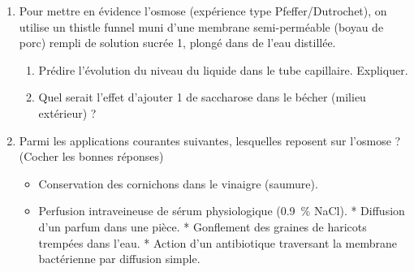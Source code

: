 \documentclass[11pt]{article}
\begin{document}
\begin{exercice}
\begin{enumerate}
    \item Pour mettre en évidence l'osmose (expérience type Pfeffer/Dutrochet), on utilise un thistle funnel muni d'une membrane semi-perméable (boyau de porc) rempli de solution sucrée \SI{1}{\molar}, plongé dans de l'eau distillée.
    \begin{enumerate}
        \item Prédire l'évolution du niveau du liquide dans le tube capillaire. Expliquer.
        \item Quel serait l'effet d'ajouter \SI{1}{\molar} de saccharose dans le bécher (milieu extérieur) ?
    \end{enumerate}
    \item Parmi les applications courantes suivantes, lesquelles reposent sur l'osmose ? (Cocher les bonnes réponses)
    \begin{itemize}
        \item Conservation des cornichons dans le vinaigre (saumure).
        \item Perfusion intraveineuse de sérum physiologique (\SI{0,9}{\%} NaCl).
        * Diffusion d'un parfum dans une pièce.
        * Gonflement des graines de haricots trempées dans l'eau.
        * Action d'un antibiotique traversant la membrane bactérienne par diffusion simple.
    \end{itemize}
\end{enumerate}
\end{exercice}
\end{document}
